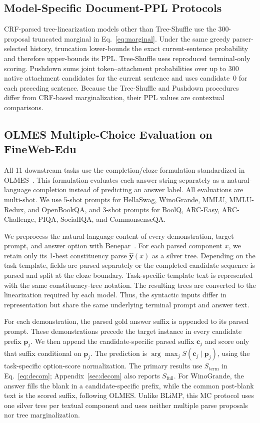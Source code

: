 \documentclass[11pt]{article}
\begin{document}
\subsection{Model-Specific Document-PPL Protocols}
\label{sec:ppl-protocol-details}

CRF-parsed tree-linearization models other than Tree-Shuffle use the 300-proposal truncated marginal in Eq.~\ref{eq:marginal}. Under the same greedy parser-selected history, truncation lower-bounds the exact current-sentence probability and therefore upper-bounds its PPL. Tree-Shuffle uses reproduced terminal-only scoring. Pushdown sums joint token--attachment probabilities over up to 300 native attachment candidates for the current sentence and uses candidate~0 for each preceding sentence. Because the Tree-Shuffle and Pushdown procedures differ from CRF-based marginalization, their PPL values are contextual comparisons.

\subsection{OLMES Multiple-Choice Evaluation on FineWeb-Edu}
\label{sec:olmes-eval}
All 11 downstream tasks use the completion/cloze formulation standardized in OLMES~\cite{gu-etal-2025-olmes}. This formulation evaluates each answer string separately as a natural-language completion instead of predicting an answer label. All evaluations are multi-shot. We use 5-shot prompts for HellaSwag, WinoGrande, MMLU, MMLU-Redux, and OpenBookQA, and 3-shot prompts for BoolQ, ARC-Easy, ARC-Challenge, PIQA, SocialIQA, and CommonsenseQA.

We preprocess the natural-language content of every demonstration, target prompt, and answer option with Benepar~\cite{kitaev-klein-2018-constituency}.
For each parsed component $x$, we retain only its 1-best constituency parse $\hat{\mathbf{y}}(x)$ as a silver tree.
Depending on the task template, fields are parsed separately or the completed candidate sequence is parsed and split at the cloze boundary.
Task-specific template text is represented with the same constituency-tree notation.
The resulting trees are converted to the linearization required by each model.
Thus, the syntactic inputs differ in representation but share the same underlying terminal prompt and answer text.

For each demonstration, the parsed gold answer suffix is appended to its parsed prompt.
These demonstrations precede the target instance in every candidate prefix $\mathbf{p}_j$.
We then append the candidate-specific parsed suffix $\mathbf{c}_j$ and score only that suffix conditional on $\mathbf{p}_j$.
The prediction is $\arg\max_j S(\mathbf{c}_j \mid \mathbf{p}_j)$, using the task-specific option-score normalization. The primary results use $S_{\text{term}}$ in Eq.~\ref{eq:decom}; Appendix~\ref{sec:decom} also reports $S_{\text{full}}$.
For WinoGrande, the answer fills the blank in a candidate-specific prefix, while the common post-blank text is the scored suffix, following OLMES.
Unlike BLiMP, this MC protocol uses one silver tree per textual component and uses neither multiple parse proposals nor tree marginalization.
\end{document}
